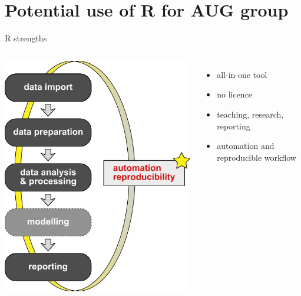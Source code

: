 \documentclass[8pt,ignorenonframetext,]{beamer}
\providecommand{\tightlist}{%
  \setlength{\itemsep}{0pt}\setlength{\parskip}{0pt}}
\newcommand{\columnsbegin}{\begin{columns}}
\newcommand{\columnsend}{\end{columns}}
\begin{document}
\section{Potential use of R for AUG
group}\label{potential-use-of-r-for-aug-group}

\begin{frame}{R strengths}

\columnsbegin


\includegraphics{imgPres/workflow.png}


\begin{itemize}
\tightlist
\item
  all-in-one tool
\item
  no licence
\item
  teaching, research, reporting
\item
  automation and reproducible workflow
\end{itemize}

\columnsend

\end{frame}
\end{document}
